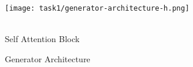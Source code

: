 \documentclass[twoside,english,notitlepage]{report}
\begin{document}
\begin{figure}[h]\label{task1:generator:figure}
    \centering
    \texttt{[image: task1/generator-architecture-h.png]}
    \caption{Generator Architecture}
    \begin{fullwidth}[innermargin=-2cm,width=\linewidth+4cm,nobreak]
        \begin{minipage}[t]{.5\textwidth}
            \centering
            \\Self Attention Block
        \end{minipage}
        \begin{minipage}[t]{.5\textwidth}
            \centering
        \end{minipage}
    \end{fullwidth}
\end{figure}
\end{document}
